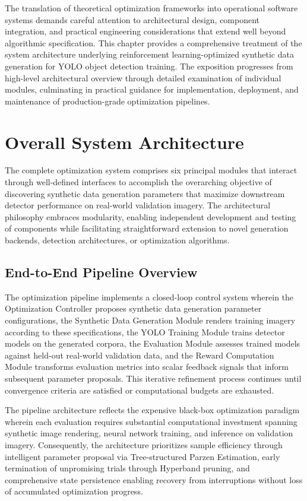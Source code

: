
The translation of theoretical optimization frameworks into operational software systems demands careful attention to architectural design, component integration, and practical engineering considerations that extend well beyond algorithmic specification. This chapter provides a comprehensive treatment of the system architecture underlying reinforcement learning-optimized synthetic data generation for YOLO object detection training. The exposition progresses from high-level architectural overview through detailed examination of individual modules, culminating in practical guidance for implementation, deployment, and maintenance of production-grade optimization pipelines.

\section{Overall System Architecture}
\label{sec:system_architecture}

The complete optimization system comprises six principal modules that interact through well-defined interfaces to accomplish the overarching objective of discovering synthetic data generation parameters that maximize downstream detector performance on real-world validation imagery. The architectural philosophy embraces modularity, enabling independent development and testing of components while facilitating straightforward extension to novel generation backends, detection architectures, or optimization algorithms.

\subsection{End-to-End Pipeline Overview}

The optimization pipeline implements a closed-loop control system wherein the Optimization Controller proposes synthetic data generation parameter configurations, the Synthetic Data Generation Module renders training imagery according to these specifications, the YOLO Training Module trains detector models on the generated corpora, the Evaluation Module assesses trained models against held-out real-world validation data, and the Reward Computation Module transforms evaluation metrics into scalar feedback signals that inform subsequent parameter proposals. This iterative refinement process continues until convergence criteria are satisfied or computational budgets are exhausted.

The pipeline architecture reflects the expensive black-box optimization paradigm wherein each evaluation requires substantial computational investment spanning synthetic image rendering, neural network training, and inference on validation imagery. Consequently, the architecture prioritizes sample efficiency through intelligent parameter proposal via Tree-structured Parzen Estimation, early termination of unpromising trials through Hyperband pruning, and comprehensive state persistence enabling recovery from interruptions without loss of accumulated optimization progress.

